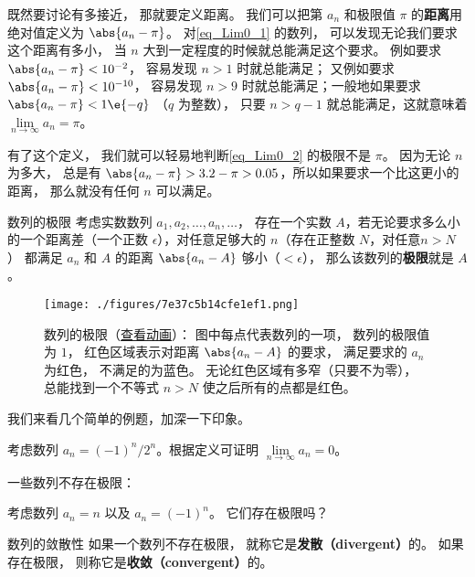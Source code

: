 既然要讨论有多接近， 那就要定义距离。 我们可以把第 $a_n$ 和极限值 $\pi$ 的\textbf{距离}用绝对值定义为 $\abs{a_n - \pi}$。 对\autoref{eq_Lim0_1} 的数列， 可以发现无论我们要求这个距离有多小， 当 $n$ 大到一定程度的时候就总能满足这个要求。 例如要求 $\abs{a_n - \pi} < 10^{-2}$， 容易发现 $n > 1$ 时就总能满足； 又例如要求 $\abs{a_n - \pi} < 10^{-10}$， 容易发现 $n > 9$ 时就总能满足；一般地如果要求 $\abs{a_n - \pi} < 1\e{-q}$ （$q$ 为整数）， 只要 $n > q-1$ 就总能满足，这就意味着 $\lim\limits_{n \to \infty } a_n = \pi$。

有了这个定义， 我们就可以轻易地判断\autoref{eq_Lim0_2} 的极限不是 $\pi$。 因为无论 $n$ 为多大， 总是有 $\abs{a_n - \pi} > 3.2 - \pi > 0.05$，所以如果要求一个比这更小的距离， 那么就没有任何 $n$ 可以满足。

\begin{definition}{数列的极限}\label{def_Lim0_2}
考虑实数数列 $a_1, a_2, \dots, a_n, \dots$， 存在一个实数 $A$，若无论要求多么小的一个距离差（一个正数 $\epsilon$），对任意足够大的 $n$（存在正整数 $N$，对任意$n > N$） 都满足 $a_n$ 和 $A$ 的距离 $\abs{a_n - A}$ 够小（$< \epsilon$）， 那么该数列的\textbf{极限}就是 $A$。
\end{definition}

\begin{figure}[ht]
\centering
\texttt{[image: ./figures/7e37c5b14cfe1ef1.png]}
\caption{数列的极限（\href{https://wuli.wiki/apps/Lim0.html}{查看动画}）： 图中每点代表数列的一项， 数列的极限值为 $1$， 红色区域表示对距离 $\abs{a_n - A}$ 的要求， 满足要求的 $a_n$ 为红色， 不满足的为蓝色。 无论红色区域有多窄（只要不为零）， 总能找到一个不等式 $n > N$ 使之后所有的点都是红色。} \label{fig_Lim0_1}
\end{figure}

我们来看几个简单的例题，加深一下印象。

\begin{example}{}
考虑数列 $a_n= {(-1)^n}/{2^n}$。根据定义可证明 $\lim\limits_{n\to\infty}a_n=0$。
\end{example}

一些数列不存在极限：
\begin{example}{}\label{ex_Lim0_10}
考虑数列 $a_n = n$ 以及 $a_n=(-1)^n$。 它们存在极限吗？
\end{example}

\begin{definition}{数列的敛散性}\label{def_Lim0_4}
如果一个数列不存在极限， 就称它是\textbf{发散（divergent）}的。 如果存在极限， 则称它是\textbf{收敛（convergent）}的。
\end{definition}

